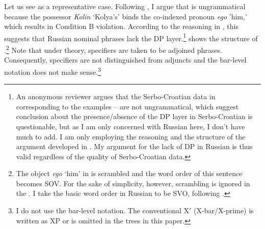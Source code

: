 \documentclass[output=paper,
]{langscibook}
\begin{document}
\begin{exe}\ex\label{bind2}
\begin{xlist}
\end{xlist}
\end{exe}
\begin{exe}\ex\label{bind3}
\begin{xlist}
\end{xlist}
\end{exe}

\noindent
Let us see  as a representative case. 
Following \citet{Despic2013}, I argue that  is ungrammatical because the possessor \textit{Kolin} `Kolya's' binds the co-indexed pronoun \textit{ego} 'him,' which results in Condition B violation. 
According to the reasoning in \citet{Despic2013}, this suggests that Russian nominal phrases lack the DP layer.\footnote{An anonymous reviewer argues that the Serbo-Croatian data in \citet{Despic2013} corresponding to the examples -- are not ungrammatical, which suggest  conclusion about the presence/absence of the DP layer in Serbo-Croatian is questionable, but as I am only concerned with Russian here, I don't have much to add. I am only employing the reasoning and the structure of the argument developed in \cite{Despic2013}. My argument for the lack of DP in Russian is thus valid regardless of the quality of  Serbo-Croatian data.}  shows the structure of .\footnote{The object \textit{ego} `him' in   is scrambled and the word order of this sentence becomes SOV. For the sake of simplicity, however, scrambling is ignored in the . I take the basic word order in Russian to be SVO, following \citet{Isachenko1966}.}  
Note that under  theory, specifiers are taken to be adjoined phrases. Consequently, specifiers are not distinguished from adjuncts and the bar-level notation does not make sense.\footnote{I do not use the bar-level notation. The conventional X$'$ (X-bar/X-prime) is written as XP or is omitted in the trees in this paper.} 
\end{document}
